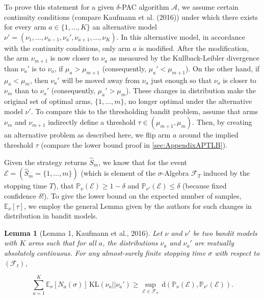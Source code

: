 \documentclass[11pt,]{article}
\newtheorem{lemma}{Lemma}
\newcommand{\KL}{\,\text{KL}}
\newcommand{\der}{\,\text{d}}
\begin{document}
To prove this statement for a given \(\delta\)-PAC algorithm
\(\mathcal{A}\), we assume certain continuity conditions (compare
Kaufmann et al. (2016)) under which there exists for every arm
\(a \in \{1, \dots, K\}\) an alternative model
\(\nu' = (\nu_1, \dots, \nu_{a-1}, \nu_a', \nu_{a+1}, \dots, \nu_K)\).
In this alternative model, in accordance with the continuity conditions,
only arm \(a\) is modified. After the modification, the arm
\(\nu_{m+1}\) is now closer to \(\nu_a\) as measured by the
Kullback-Leibler divergence than \(\nu_a'\) is to \(\nu_a\), if
\(\mu_a > \mu_{m+1}\) (consequently, \(\mu_a' < \mu_{m+1}\)). On the
other hand, if \(\mu_a < \mu_{m}\), then \(\nu_a'\) will be moved away
from \(\nu_a\) just enough so that \(\nu_a\) is closer to \(\nu_m\) than
to \(\nu_a'\) (consequently, \(\mu_a' > \mu_m\)). These changes in
distribution make the original set of optimal arms, \(\{1,\dots,m\}\),
no longer optimal under the alternative model \(\nu'\). To compare this
to the thresholding bandit problem, assume that arms \(\nu_{m}\) and
\(\nu_{m+1}\) indirectly define a threshold
\(\tau \in (\mu_{m+1},\mu_m)\). Then, by creating an alternative problem
as described here, we flip arm \(a\) around the implied threshold
\(\tau\) (compare the lower bound proof in \autoref{sec:AppendixAPTLB}).

Given the strategy returns \(\hat{S}_m\), we know that for the event
\(\mathcal{E} = (\hat{S}_m = \{1, \dots, m\})\) (which is element of the
\(\sigma\)-Algebra \(\mathcal{F}_{T}\) induced by the stopping time
\(T\)), that \(\mathbb{P}_{\nu}(\mathcal{E}) \geq 1-\delta\) and
\(\mathbb{P}_{\nu'}(\mathcal{E}) \leq \delta\) (because fixed confidence
\(\delta\)!). To give the lower bound on the expected number of samples,
\(\mathbb{E}_{\nu}[\tau]\), we employ the general Lemma given by the
authors for such changes in distribution in bandit models.

\begin{lemma}[Lemma 1, Kaufmann et al., 2016] \label{theorem:KaufmannEtAlLemma1}
Let $\nu$ and $\nu'$ be two bandit models with $K$ arms such that for all $a$, the distributions $\nu_a$ and $\nu_a'$ are mutually absolutely continuous. For any almost-surely finite stopping time $\sigma$ with respect to $(\mathcal{F}_t)$,

\begin{equation*}
\sum_{a=1}^{K} \mathbb{E}_{\nu} [N_a(\sigma)] \KL(\nu_a|| \nu_a') \geq \sup_{\mathcal{E} \in \mathcal{F}_{\sigma}} \der (\mathbb{P}_{\nu}(\mathcal{E}), \mathbb{P}_{\nu'}(\mathcal{E})).
\end{equation*}
\end{lemma}
\end{document}

